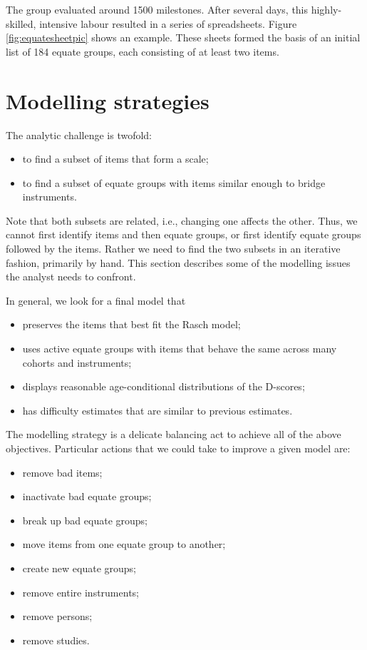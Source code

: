 \documentclass[
]{book}
\providecommand{\tightlist}{%
  \setlength{\itemsep}{0pt}\setlength{\parskip}{0pt}}
\begin{document}
The group evaluated around 1500 milestones. After several days, this highly-skilled, intensive labour resulted in a series of spreadsheets. Figure \ref{fig:equatesheetpic} shows an example. These sheets formed the basis of an initial list of 184 equate groups, each consisting of at least two items.

\hypertarget{sec:modellingstrategies}{%
\section{Modelling strategies}\label{sec:modellingstrategies}}

The analytic challenge is twofold:

\begin{itemize}
\tightlist
\item
  to find a subset of items that form a scale;
\item
  to find a subset of equate groups with items similar enough to bridge instruments.
\end{itemize}

Note that both subsets are related, i.e., changing one affects the other. Thus, we cannot first identify items and then equate groups, or first identify equate groups followed by the items. Rather we need to find the two subsets in an iterative fashion, primarily by hand. This section describes some of the modelling issues the analyst needs to confront.

In general, we look for a final model that

\begin{itemize}
\tightlist
\item
  preserves the items that best fit the Rasch model;
\item
  uses active equate groups with items that behave the same across many cohorts and instruments;
\item
  displays reasonable age-conditional distributions of the D-scores;
\item
  has difficulty estimates that are similar to previous estimates.
\end{itemize}

The modelling strategy is a delicate balancing act to achieve all of the above objectives. Particular actions that we could take to improve a given model are:

\begin{itemize}
\tightlist
\item
  remove bad items;
\item
  inactivate bad equate groups;
\item
  break up bad equate groups;
\item
  move items from one equate group to another;
\item
  create new equate groups;
\item
  remove entire instruments;
\item
  remove persons;
\item
  remove studies.
\end{itemize}
\end{document}

